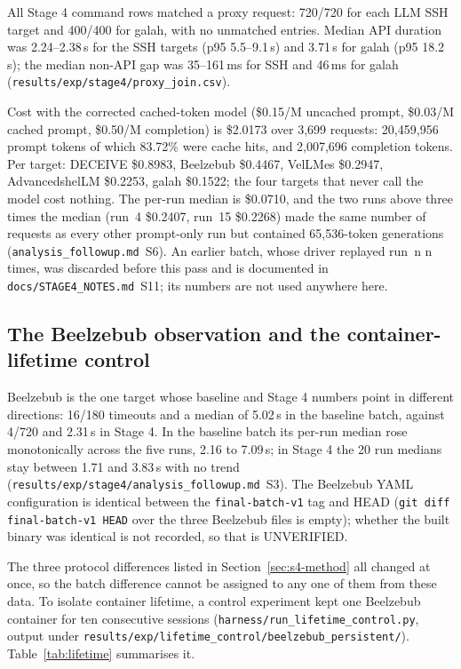 \documentclass[a4paper,11pt]{article}
\begin{document}
All Stage 4 command rows matched a proxy request: 720/720 for each LLM SSH
target and 400/400 for galah, with no unmatched entries. Median API duration was
2.24--2.38\,s for the SSH targets (p95 5.5--9.1\,s) and 3.71\,s for galah (p95
18.2\,s); the median non-API gap was 35--161\,ms for SSH and 46\,ms for galah
(\texttt{results/exp/stage4/proxy\_join.csv}).

Cost with the corrected cached-token model (\$0.15/M uncached prompt, \$0.03/M
cached prompt, \$0.50/M completion) is \$2.0173 over 3,699 requests: 20,459,956
prompt tokens of which 83.72\% were cache hits, and 2,007,696 completion
tokens. Per target: DECEIVE \$0.8983, Beelzebub \$0.4467, VelLMes \$0.2947,
AdvancedshelLM \$0.2253, galah \$0.1522; the four targets that never call the
model cost nothing. The per-run median is \$0.0710, and the two runs above
three times the median (run~4 \$0.2407, run~15 \$0.2268) made the same number of
requests as every other prompt-only run but contained 65,536-token generations
(\texttt{analysis\_followup.md}~S6). An earlier batch, whose driver replayed
run~n n times, was discarded before this pass and is documented in
\texttt{docs/STAGE4\_NOTES.md}~S11; its numbers are not used anywhere here.

\subsection{The Beelzebub observation and the container-lifetime control}
\label{sec:lifetime}

Beelzebub is the one target whose baseline and Stage 4 numbers point in
different directions: 16/180 timeouts and a median of 5.02\,s in the baseline
batch, against 4/720 and 2.31\,s in Stage 4. In the baseline batch its per-run
median rose monotonically across the five runs, 2.16 to 7.09\,s; in Stage 4 the
20 run medians stay between 1.71 and 3.83\,s with no trend
(\texttt{results/exp/stage4/analysis\_followup.md}~S3). The Beelzebub YAML
configuration is identical between the \texttt{final-batch-v1} tag and HEAD
(\texttt{git diff final-batch-v1 HEAD} over the three Beelzebub files is empty);
whether the built binary was identical is not recorded, so that is UNVERIFIED.

The three protocol differences listed in Section~\ref{sec:s4-method} all
changed at once, so the batch difference cannot be assigned to any one of them
from these data. To isolate container lifetime, a control experiment kept one
Beelzebub container for ten consecutive sessions
(\texttt{harness/run\_lifetime\_control.py}, output under
\texttt{results/exp/lifetime\_control/beelzebub\_persistent/}).
Table~\ref{tab:lifetime} summarises it.
\end{document}
